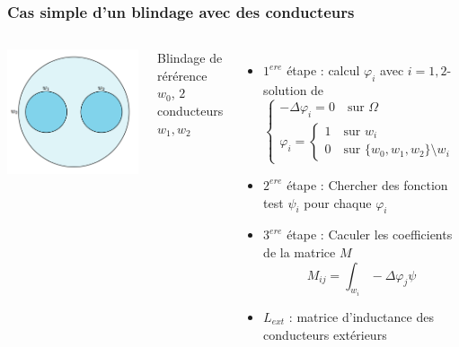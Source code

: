 \begin{frame}
\frametitle{Cas simple d'un blindage avec des conducteurs}
\begin{columns}[T]
\begin{center}
\includegraphics[scale=0.2]{figures/f3}
\end{center}
Blindage de r\'er\'erence $w_0$, $2$ conducteurs $w_1, w_2$
\begin{itemize}
\item $1^{ere}$ \'etape : calcul $\varphi_i$ avec $i=1,2$-solution de
 \begin{equation}
 \begin{cases}
 -\Delta\varphi_i = 0 \quad \text{sur } \Omega \\
 \varphi_i =  
 \begin{cases}
 1 \quad \text{sur } w_i \\
 0 \quad \text{sur } \{w_0,w_1,w_2 \} \setminus w_i
 \end{cases}
 \end{cases}
 \end{equation}
\item $2^{ere}$ \'etape : Chercher des fonction test $\psi_i$ pour chaque $\varphi_i$
\item $3^{ere}$ \'etape : Caculer les coefficients de la matrice $M$
\begin{equation}
M_{ij} = \int_{w_i} -\Delta\varphi_j \psi 
\end{equation}
\item $L_{ext}$ : matrice d'inductance des conducteurs ext\'erieurs  
\end{itemize}
\end{columns}
\end{frame} 

